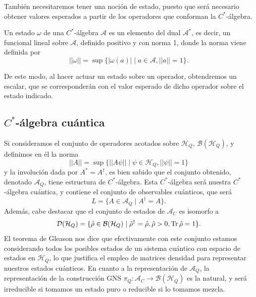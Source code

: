 \documentclass[openany, 11pt]{book}
\numberwithin{equation}{chapter}
\newcommand{\Hq}{\mathcal H_Q}
\newcommand{\Ac}{\mathcal A_C}
\newcommand{\Aq}{\mathcal A_Q}
\begin{document}
También necesitaremos tener una noción de estado, puesto que será necesario obtener valores esperados a partir de los operadores que conforman la $C^*$-álgebra.

\begin{definition}[Estado]
    Un estado $\omega$ de una $C^*$-álgebra $\mathcal A$ es un elemento del dual $\mathcal A^*$, es decir, un funcional lineal sobre $\mathcal A$, definido positivo y con norma 1, 
    donde la norma viene definida por \begin{equation}
        ||\omega|| =\sup\{|\omega(a)| \mid a\in\mathcal A, ||a|| = 1\}.
    \end{equation}
\end{definition}

De este modo, al hacer actuar un estado sobre un operador, obtendremos un escalar, que se corresponderán con el valor esperado de dicho operador sobre el estado indicado.

\subsection{$C^*$-álgebra cuántica}

Si consideramos el conjunto de operadores acotados sobre $\Hq$, $\mathcal B(\Hq)$, y definimos en él la norma \begin{equation}
    ||A|| = \sup\{||A\psi|| \mid \psi \in\Hq, ||\psi||=1\}
\end{equation}y la involución dada por $A^* = A^\dagger$,  es bien sabido que el conjunto obtenido, denotado $\Aq$, tiene estructura de $C^*$-álgebra. 
Esta $C^*$-álgebra será nuestra $C^*$-álgebra cuántica, y contiene el conjunto de observables cuánticos, que será \begin{equation}
    L = \{A\in\Aq \mid A^\dagger = A\}.
\end{equation}Además, cabe destacar que el conjunto de estados de $\Ac$ es isomorfo a \begin{equation}
    \mathcal D(\Hq) = \{\hat\rho \in\mathcal B(\Hq) \mid \hat\rho^\dagger=\hat\rho, \hat\rho>0,\Tr\hat\rho=1\}.
\end{equation}El teorema de Gleason nos dice que efectivamente con este conjunto estamos considerando todos los posibles estados de un sistema cuántico con espacio 
de estados en $\Hq$, lo que justifica el empleo de matrices densidad para representar nuestros estados cuánticos. En cuanto a la representación de $\Aq$, la representación de la construcción GNS 
$\pi_Q:\Ac\to\mathcal B(\Hq)$ es la natural, y será irreducible si tomamos un estado puro o reducible si lo tomamos mezcla.
\end{document}

